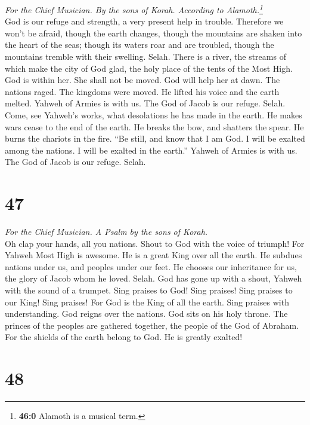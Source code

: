 \emph{For the Chief Musician. By the sons of Korah. According to
Alamoth.\footnote{\textbf{46:0} Alamoth is a musical term.}}\\
 God is our refuge and strength, a very present help in
trouble.  Therefore we won't be afraid, though the earth
changes, though the mountains are shaken into the heart of the seas;
 though its waters roar and are troubled, though the
mountains tremble with their swelling. Selah.  There is a
river, the streams of which make the city of God glad, the holy place of
the tents of the Most High.  God is within her. She shall
not be moved. God will help her at dawn.  The nations
raged. The kingdoms were moved. He lifted his voice and the earth
melted.  Yahweh of Armies is with us. The God of Jacob is
our refuge. Selah.  Come, see Yahweh's works, what
desolations he has made in the earth.  He makes wars cease
to the end of the earth. He breaks the bow, and shatters the spear. He
burns the chariots in the fire.  ``Be still, and know
that I am God. I will be exalted among the nations. I will be exalted in
the earth.''  Yahweh of Armies is with us. The God of
Jacob is our refuge. Selah.

\hypertarget{section-46}{%
\section{47}\label{section-46}}

\emph{For the Chief Musician. A Psalm by the sons of Korah.}\\
 Oh clap your hands, all you nations. Shout to God with
the voice of triumph!  For Yahweh Most High is awesome. He
is a great King over all the earth.  He subdues nations
under us, and peoples under our feet.  He chooses our
inheritance for us, the glory of Jacob whom he loved. Selah.
 God has gone up with a shout, Yahweh with the sound of a
trumpet.  Sing praises to God! Sing praises! Sing praises
to our King! Sing praises!  For God is the King of all the
earth. Sing praises with understanding.  God reigns over
the nations. God sits on his holy throne.  The princes of
the peoples are gathered together, the people of the God of Abraham. For
the shields of the earth belong to God. He is greatly exalted!

\hypertarget{section-47}{%
\section{48}\label{section-47}}

